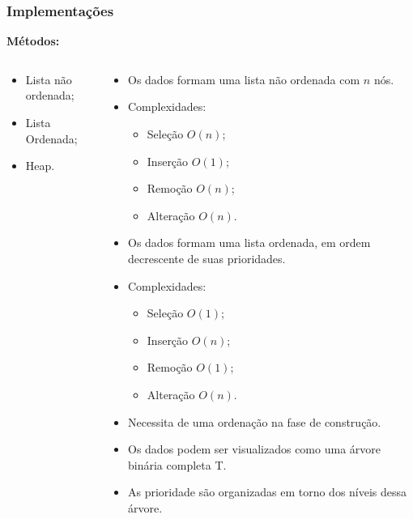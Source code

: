 \documentclass[10pt]{beamer}
\newcommand{\duascolunas}[2]{
  \begin{columns}
    \begin{column}{6cm}
      #1
    \end{column}
    \begin{column}{6cm}
      #2
    \end{column}
  \end{columns}
}
\begin{document}
\begin{frame}
    \frametitle{Implementações}

    \large
    \textbf{Métodos:}
    \duascolunas{
        \begin{itemize}[<+->]\setlength{\itemsep}{1em}
                  \color{cinza}
            \item<alert@1> Lista não ordenada;
            \item<alert@2> Lista Ordenada;
            \item<alert@3> Heap.
        \end{itemize}
    }{
        \begin{itemize}[<only@1|alert@1>]\setlength{\itemsep}{1em}
            \item Os dados formam uma lista não ordenada com $n$ nós.
            \item Complexidades:\vspace*{1em}
                  \begin{itemize}\setlength{\itemsep}{1em}
                      \item Seleção $O(n)$;
                      \item Inserção $O(1)$;
                      \item Remoção $O(n)$;
                      \item Alteração $O(n)$.
                  \end{itemize}
        \end{itemize}

        \begin{itemize}[<only@2|alert@2>]
            \item Os dados formam uma lista ordenada, em ordem decrescente de suas prioridades. \vfill
            \item Complexidades:
                  \begin{itemize}
                      \item Seleção $O(1)$;
                      \item Inserção $O(n)$;
                      \item Remoção $O(1)$;
                      \item Alteração $O(n)$.
                  \end{itemize}\vfill
            \item Necessita de uma ordenação na fase de construção.
        \end{itemize}

        \begin{itemize}[<only@3|alert@3>]
            \item Os dados podem ser visualizados como uma árvore binária completa T.
            \item As prioridade são organizadas em torno dos níveis dessa árvore.
        \end{itemize}
    }
\end{frame}
\end{document}
